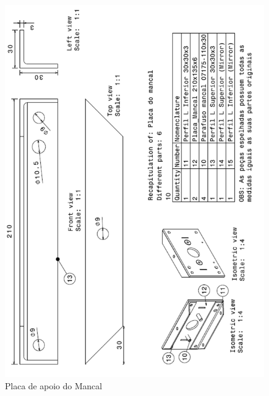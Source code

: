 \begin{anexosenv}
\begin{figure}[!ht]
	\centering
		\includegraphics[scale=0.6]{figuras/estrutura/anexos/13.png}
	\caption{Placa de apoio do Mancal}
\end{figure}


\end{anexosenv}
